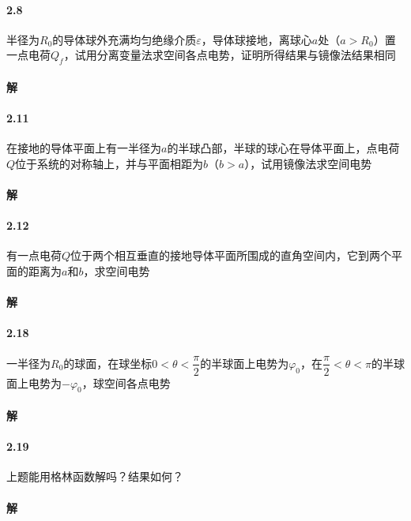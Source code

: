 \documentclass{article}
\begin{document}
\paragraph{2.8}

半径为$R_0$的导体球外充满均匀绝缘介质$\varepsilon$，导体球接地，离球心$a$处（$a>R_0$）置一点电荷$Q_f$，试用分离变量法求空间各点电势，证明所得结果与镜像法结果相同

\paragraph{解}



\paragraph{2.11}

在接地的导体平面上有一半径为$a$的半球凸部，半球的球心在导体平面上，点电荷$Q$位于系统的对称轴上，并与平面相距为$b$（$b>a$），试用镜像法求空间电势

\paragraph{解}




\paragraph{2.12}

有一点电荷$Q$位于两个相互垂直的接地导体平面所围成的直角空间内，它到两个平面的距离为$a$和$b$，求空间电势

\paragraph{解}




\paragraph{2.18}

一半径为$R_0$的球面，在球坐标$0<\theta< \dfrac{\pi}{2} $的半球面上电势为$\varphi_0$，在$\dfrac{\pi}{2} < \theta < \pi $的半球面上电势为$-\varphi_0$，球空间各点电势

\paragraph{解}




\paragraph{2.19}

上题能用格林函数解吗？结果如何？

\paragraph{解}
\end{document}
